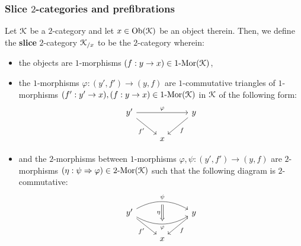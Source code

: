         \subsubsection{Slice \texorpdfstring{$2$}{}-categories and prefibrations}
            \begin{definition} \label{def: slice_2_categories}
                Let $\mathcal{K}$ be a $2$-category and let $x \in \mathrm{Ob}(\mathcal{K})$ be an object therein. Then, we define the \textbf{slice} $2$-category $\mathcal{K}_{/x}$ to be the $2$-category wherein:
                    \begin{itemize}
                        \item the objects are $1$-morphisms $(f: y \to x) \in 1\text{-}\mathrm{Mor}(\mathcal{K})$,
                        \item the $1$-morphisms $\varphi: (y', f') \to (y, f)$ are $1$-commutative triangles of $1$-morphisms $(f': y' \to x), (f: y \to x) \in 1\text{-}\mathrm{Mor}(\mathcal{K})$ in $\mathcal{K}$ of the following form:
                            $$
                                \begin{tikzcd}
                                	{y'} && y \\
                                	& x
                                	\arrow["\varphi", from=1-1, to=1-3]
                                	\arrow["{f'}"', from=1-1, to=2-2]
                                	\arrow["f", from=1-3, to=2-2]
                                \end{tikzcd}
                            $$
                        \item and the $2$-morphisms between $1$-morphisms $\varphi, \psi: (y', f') \to (y, f)$ are $2$-morphisms $(\eta: \psi \Rightarrow \varphi) \in 2\text{-}\mathrm{Mor}(\mathcal{K})$ such that the following diagram is $2$-commutative:
                            $$
                                \begin{tikzcd}
                                	{y'} && y \\
                                	& x
                                	\arrow["{f'}"', from=1-1, to=2-2]
                                	\arrow["f", from=1-3, to=2-2]
                                	\arrow[""{name=0, anchor=center, inner sep=0}, "\varphi"', bend right, from=1-1, to=1-3]
                                	\arrow[""{name=1, anchor=center, inner sep=0}, "\psi", bend left, from=1-1, to=1-3]
                                	\arrow["\eta"', shorten <=3pt, shorten >=3pt, Rightarrow, from=1, to=0]
                                \end{tikzcd}
                            $$
                    \end{itemize}
            \end{definition}
